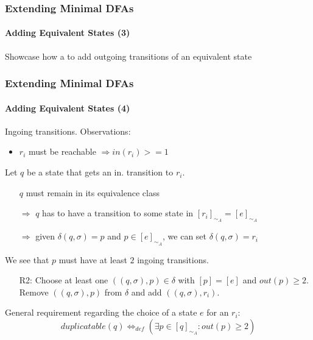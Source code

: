 \documentclass[handout,10pt]{beamer}%
\begin{document}
	\begin{frame}
	\frametitle{Extending Minimal DFAs}
	\framesubtitle{Adding Equivalent States (3)}
	
	Showcase how a to add outgoing transitions of an equivalent state
	
	\end{frame}

	\begin{frame}
		\frametitle{Extending Minimal DFAs}
		\framesubtitle{Adding Equivalent States (4)}
		
		Ingoing transitions. Observations:
		
		\vspace{0.2cm}
		\begin{itemize}
			\item $r_i$ must be reachable $\Rightarrow in(r_i) >= 1$
		\end{itemize}
	
		\vspace{0.2cm}
		Let $q$ be a state that gets an in. transition to $r_i$.
		
		\vspace{0.2cm}
		\begin{itemize}
			\item[] $q$ must remain in its equivalence class
			
			\item[$\Rightarrow$] $q$ has to have a transition to some state in $[r_i]_{\sim_A} = [e]_{\sim_A}$
			
			\item[$\Rightarrow$] given $\delta(q, \sigma) = p$ and $p \in [e]_{\sim_A}$, we can set $\delta(q, \sigma) = r_i$
		\end{itemize}
		
		\vspace{0.2cm}
		We see that $p$ must have at least $2$ ingoing transitions.
		
		\vspace{0.2cm}
		\begin{itemize}
			\item[R2:] Choose at least one $((q, \sigma), p) \in \delta$ with $[p] = [e]$ and $out(p) \geq 2$. Remove $((q, \sigma), p)$ from $\delta$ and add $((q, \sigma), r_i)$.
		\end{itemize}
	
		\vspace{0.2cm}
		General requirement regarding the choice of a state $e$ for an $r_i$: 
		\[
			duplicatable(q) \Leftrightarrow_{def} (\exists p \in [q]_{\sim_A}\colon out(p) \geq 2)
		\]
	
	\end{frame}
\end{document}
